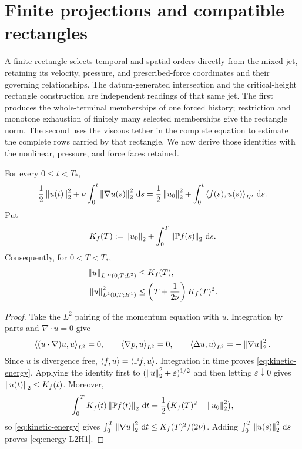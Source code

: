\section{Finite projections and compatible rectangles}

A finite rectangle selects temporal and spatial orders directly from the
mixed jet, retaining its velocity, pressure, and prescribed-force coordinates
and their governing relationships.  The datum-generated intersection and the
critical-height rectangle construction are independent readings of that same
jet.  The first produces the whole-terminal memberships of one forced history;
restriction and monotone exhaustion of finitely many selected memberships give
the rectangle norm.  The second uses the viscous tether in the complete
equation to estimate the complete rows carried by that rectangle.  We now
derive those identities with the nonlinear, pressure, and force faces retained.


\begin{proposition}
\label{prop:kinetic-energy}
For every \(0\le t<T_*\),
\begin{equation}
 \frac12\left\lVert u(t)\right\rVert_2^2
 +\nu\int_0^t\left\lVert \nabla u(s)\right\rVert_2^2\,\mathrm d s
 =\frac12\left\lVert u_0\right\rVert_2^2
 +\int_0^t\left\langle f(s),u(s)\right\rangle_{L^2}\,\mathrm d s.
 \label{eq:kinetic-energy}
\end{equation}
Put
\[
 K_f(T):=\left\lVert u_0\right\rVert_2+\int_0^T\left\lVert \mathbb P f(s)\right\rVert_2\,\mathrm d s.
\]
Consequently, for \(0<T<T_*\),
\begin{align}
 \left\lVert u\right\rVert_{L^\infty(0,T;L^2)}&\le K_f(T),
 \label{eq:energy-Linf}\\
 \left\lVert u\right\rVert_{L^2(0,T;H^1)}^2
 &\le\left(T+\frac1{2\nu}\right)K_f(T)^2.
 \label{eq:energy-L2H1}
\end{align}
\end{proposition}

\begin{proof}
Take the \(L^2\) pairing of the momentum equation with \(u\).  Integration
by parts and \(\nabla\cdot u=0\) give
\[
 \left\langle (u\cdot\nabla)u,u\right\rangle_{L^2}=0,
 \qquad
 \left\langle \nabla p,u\right\rangle_{L^2}=0,
 \qquad
 \left\langle \Delta u,u\right\rangle_{L^2}=-\left\lVert \nabla u\right\rVert_2^2.
\]
Since \(u\) is divergence free,
\(\left\langle f,u\right\rangle=\left\langle \mathbb P f,u\right\rangle\).  Integration in time proves
\eqref{eq:kinetic-energy}.  Applying the identity first to
\((\left\lVert u\right\rVert_2^2+\varepsilon)^{1/2}\) and then letting
\(\varepsilon\downarrow0\) gives \(\left\lVert u(t)\right\rVert_2\le K_f(t)\).  Moreover,
\[
 \int_0^T K_f(t)\left\lVert \mathbb P f(t)\right\rVert_2\,\mathrm d t
 =\frac12\bigl(K_f(T)^2-\left\lVert u_0\right\rVert_2^2\bigr),
\]
so \eqref{eq:kinetic-energy} gives
\(\int_0^T\left\lVert \nabla u\right\rVert_2^2\,\mathrm d t\le K_f(T)^2/(2\nu)\).
Adding \(\int_0^T\left\lVert u(s)\right\rVert_2^2\,\mathrm d s\) proves
\eqref{eq:energy-L2H1}.
\end{proof}

